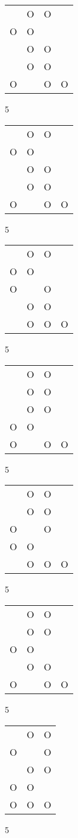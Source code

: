 \begin{tabular}{|m{0.2cm}m{0.2cm}m{0.2cm}m{0.2cm}|}\hline
 &O&O& \\
O&O& & \\
 &O&O& \\
 &O&O& \\
O& &O&O\\
\hline\end{tabular}5
\begin{tabular}{|m{0.2cm}m{0.2cm}m{0.2cm}m{0.2cm}|}\hline
 &O&O& \\
O&O& & \\
 &O&O& \\
 &O&O& \\
O& &O&O\\
\hline\end{tabular}5
\begin{tabular}{|m{0.2cm}m{0.2cm}m{0.2cm}m{0.2cm}|}\hline
 &O&O& \\
O&O& & \\
O& &O& \\
 &O&O& \\
 &O&O&O\\
\hline\end{tabular}5
\begin{tabular}{|m{0.2cm}m{0.2cm}m{0.2cm}m{0.2cm}|}\hline
 &O&O& \\
 &O&O& \\
 &O&O& \\
O&O& & \\
O& &O&O\\
\hline\end{tabular}5
\begin{tabular}{|m{0.2cm}m{0.2cm}m{0.2cm}m{0.2cm}|}\hline
 &O&O& \\
 &O&O& \\
O& &O& \\
O&O& & \\
 &O&O&O\\
\hline\end{tabular}5
\begin{tabular}{|m{0.2cm}m{0.2cm}m{0.2cm}m{0.2cm}|}\hline
 &O&O& \\
 &O&O& \\
O&O& & \\
 &O&O& \\
O& &O&O\\
\hline\end{tabular}5
\begin{tabular}{|m{0.2cm}m{0.2cm}m{0.2cm}|}\hline
 &O&O\\
O& &O\\
 &O&O\\
O&O& \\
O&O&O\\
\hline\end{tabular}5
